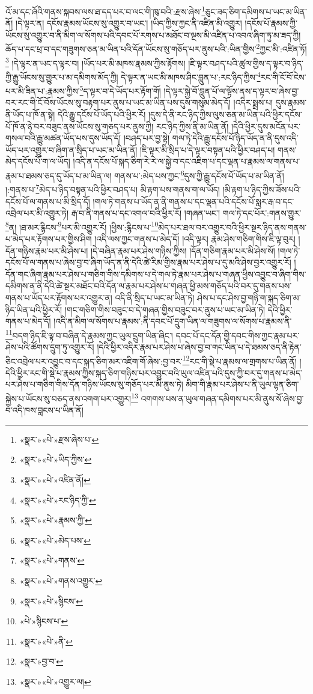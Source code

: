 འོ་མ་དང་ཞོའི་གནས་སྐབས་ལས་ཐ་དད་པར་བ་ལང་གི་ཁུ་བའི་:རྫས་ཞེས་\footnote{«སྣར་»«པེ་»རྫས་ཞེས་པ་}ཅུང་ཟད་ཅིག་དམིགས་པ་ཡང་མ་ཡིན་ནོ། །དེ་ལྟར་ན། དངོས་རྣམས་ཡོངས་སུ་འགྱུར་བ་ཡང་། །ཡིད་ཀྱིས་ཀྱང་ནི་འཛིན་མི་འགྱུར། །དངོས་པོ་རྣམས་ཀྱི་ཡོངས་སུ་འགྱུར་བ་ནི་མིག་ལ་སོགས་པའི་དབང་པོ་རགས་པ་མཐོང་བ་ལྔས་མི་འཛིན་པ་འབའ་ཞིག་ཏུ་མ་ཟད་ཀྱི། ཆོད་པ་དང་ཕྲ་བ་དང་གཟུགས་ཅན་མ་ཡིན་པའི་དོན་ཡོངས་སུ་གཅོད་པར་ནུས་པའི་:ཡིན་གྱིས་\footnote{«སྣར་»«པེ་»ཡིད་ཀྱིས་}ཀྱང་མི་:འཛིན་ཏོ།\footnote{«སྣར་»«པེ་»འཛིན་ནོ།} །དེ་ལྟར་ན་ཡང་ད་ལྟར་བ། །ཡོད་པར་མི་མཁས་རྣམས་ཀྱིས་རྟོགས། །ཇི་ལྟར་བཤད་པའི་ཚུལ་གྱིས་ད་ལྟར་བ་ཉིད་ཀྱི་རྒྱུ་ཡོངས་སུ་གྱུར་པ་མ་དམིགས་མོད་ཀྱི། དེ་ལྟར་ན་ཡང་མི་མཁས་ཤིང་བླུན་པ་:རང་ཉིད་ཀྱིས་\footnote{«སྣར་»«པེ་»རང་ཉིད་ཀྱི་}རང་གི་ངོ་བོ་ངེས་པར་མི་ཟིན་པ་:རྣམས་ཀྱིས་\footnote{«སྣར་»«པེ་»རྣམས་ཀྱི་}ད་ལྟར་བ་དེ་ཡོད་པར་རྟོག་གོ། །དེ་ལྟར་སྐྱེ་བོ་བླུན་པོ་ལ་ལྟོས་ནས་ད་ལྟར་བ་ཞེས་བྱ་བར་རང་གི་ངོ་བོས་ཡོངས་སུ་བརྟག་པར་ནུས་པ་ཡང་མ་ཡིན་པས་དུས་གསུམ་མེད་དོ། །འདིར་སྨྲས་པ། དུས་རྣམས་ནི་ཡོད་པ་ཁོ་ན་སྟེ། དེའི་རྒྱུ་དངོས་པོ་ཡོད་པའི་ཕྱིར་རོ། །དུས་དེ་ནི་རང་ཉིད་ཀྱིས་ལུས་ཅན་མ་ཡིན་པའི་ཕྱིར་དངོས་པོ་ཁོ་ན་ཉེ་བར་བཟུང་ནས་ཡོངས་སུ་གཅད་པར་ནུས་ཀྱི། རང་ཉིད་ཀྱིས་ནི་མ་ཡིན་ནོ། །དེའི་ཕྱིར་དུས་མངོན་པར་གསལ་བའི་རྒྱུ་མཚན་ཡོད་པས་དུས་ཡོད་དོ། །བཤད་པར་བྱ་སྟེ། གལ་ཏེ་དེའི་རྒྱུ་དངོས་པོ་ཉིད་ཡོད་ན་ནི་དུས་འདི་ཡོད་པར་འགྱུར་བ་ཞིག་ན་སྲིད་པ་ཡང་མ་ཡིན་ནོ། །ཇི་ལྟར་མི་སྲིད་པ་དེ་ལྟར་བསྟན་པའི་ཕྱིར་བཤད་པ། གནས་མེད་དངོས་པོ་ག་ལ་ཡོད། །འདི་ན་དངོས་པོ་སྐད་ཅིག་རེ་རེ་ལ་སྐྱེ་བ་དང་འཇིག་པ་དང་ལྡན་པ་རྣམས་ལ་གནས་པ་རྣམ་པ་ཐམས་ཅད་དུ་ཡོད་པ་མ་ཡིན་ལ། གནས་པ་:མེད་པས་ཀྱང་\footnote{«སྣར་»«པེ་»མེད་པས་}དུས་ཀྱི་རྒྱུ་དངོས་པོ་ཡོད་པ་མ་ཡིན་ནོ། །:གནས་པ་\footnote{«སྣར་»«པེ་»གནས་}མེད་པ་ཉིད་བསྟན་པའི་ཕྱིར་བཤད་པ། མི་རྟག་པས་གནས་ག་ལ་ཡོད། །མི་རྟག་པ་ཉིད་ཀྱིས་ཟོས་པའི་དངོས་པོ་ལ་གནས་པ་མི་སྲིད་དོ། །གལ་ཏེ་གནས་པ་ཡོད་ན་ནི་གནས་པ་དང་ལྡན་པའི་དངོས་པོ་སླར་རྒ་བ་དང་འབྲེལ་པར་མི་འགྱུར་ཏེ། རྒ་བ་ནི་གནས་པ་དང་འགལ་བའི་ཕྱིར་རོ། །གཞན་ཡང་། གལ་ཏེ་དང་པོར་:གནས་གྱུར་\footnote{«སྣར་»«པེ་»གནས་འགྱུར་}ན། །ཐ་མར་རྙིངས་\footnote{«སྣར་»«པེ་»སྙིངས་}པར་མི་འགྱུར་རོ། །ཕྱིས་:རྙིངས་པ་\footnote{«པེ་»སྙིངས་པ་}མེད་པར་ཐལ་བར་འགྱུར་བའི་ཕྱིར་སྔར་ཉིད་ནས་གནས་པ་མེད་པར་རྟོགས་པར་གྱིས་ཤིག །འདི་ལས་ཀྱང་གནས་པ་མེད་དོ། །འདི་ལྟར། རྣམ་ཤེས་གཅིག་གིས་ཇི་ལྟ་བུར། །དོན་གཉིས་རྣམ་པར་མི་ཤེས་པ། །དེ་བཞིན་རྣམ་པར་ཤེས་གཉིས་ཀྱིས། །དོན་གཅིག་རྣམ་པར་མི་ཤེས་སོ། །གལ་ཏེ་དངོས་པོ་ལ་གནས་པ་ཞེས་བྱ་བ་ཞིག་ཡོད་ན་ནི་དེའི་ཚེ་རིམ་གྱིས་རྣམ་པར་ཤེས་པ་དུ་མའི་ཤེས་བྱར་འགྱུར་རོ། །དོན་གང་ཞིག་རྣམ་པར་ཤེས་པ་གཅིག་གིས་དམིགས་པ་དེ་གལ་ཏེ་རྣམ་པར་ཤེས་པ་གཞན་ཕྱིས་འབྱུང་བ་ཞིག་གིས་དམིགས་ན་ནི་དེའི་ཚེ་སྔར་མཐོང་བའི་དོན་ལ་རྣམ་པར་ཤེས་པ་གཞན་ཕྱི་མས་གཅོད་པའི་བར་དུ་གནས་པས་གནས་པ་ཡོད་པར་རྟོགས་པར་འགྱུར་ན། འདི་ནི་སྲིད་པ་ཡང་མ་ཡིན་ཏེ། ཤེས་པ་དང་ཤེས་བྱ་གཉི་ག་སྐད་ཅིག་མ་ཉིད་ཡིན་པའི་ཕྱིར་རོ། །གང་གཅིག་གིས་བཟུང་བ་དེ་གཞན་གྱིས་བཟུང་བར་ནུས་པ་ཡང་མ་ཡིན་ཏེ། དེའི་ཕྱིར་གནས་པ་མེད་དོ། །འདི་ན་མིག་ལ་སོགས་པ་རྣམས་:ནི་དབང་པོ་དྲུག་ཡིན་ལ་གཟུགས་ལ་སོགས་པ་རྣམས་ནི་\footnote{«སྣར་»«པེ་»ནི་}བདག་ཉིད་ཇི་ལྟ་བ་བཞིན་དེ་རྣམས་ཀྱང་ཡུལ་དྲུག་ཡིན་ཞིང་། དབང་པོ་དང་དོན་གྱི་དབང་གིས་ཀྱང་རྣམ་པར་ཤེས་པའི་ཚོགས་དྲུག་ཏུ་འགྱུར་རོ། །དེའི་ཕྱིར་འདིར་རྣམ་པར་ཤེས་པ་ཞེས་བྱ་བ་གང་ཡིན་པ་དེ་ཐམས་ཅད་ནི་རྟེན་ཅིང་འབྲེལ་པར་འབྱུང་བ་དང་སྐད་ཅིག་མར་འཇིག་གོ་ཞེས་:བྱ་བར་\footnote{«སྣར་»བྱ་བ་}རང་གི་སྡེ་པ་རྣམས་ལ་གྲགས་པ་ཡིན་ནོ། །དེའི་ཕྱིར་རང་གི་སྡེ་པ་རྣམས་ཀྱིས་སྐད་ཅིག་གཉིས་པར་འབྱུང་བའི་ཡུལ་འཛིན་པའི་དུས་ཀྱི་བར་དུ་གནས་པ་མེད་པར་ཤེས་པ་གཅིག་གིས་དོན་གཉིས་ཡོངས་སུ་གཅོད་པར་མི་ནུས་ཏེ། མིག་གི་རྣམ་པར་ཤེས་པ་ནི་ཡུལ་ལྷན་ཅིག་སྐྱེས་པ་ཡོངས་སུ་བཅད་ནས་འགག་པར་འགྱུར།\footnote{«སྣར་»«པེ་»འགྱུར་ལ།} འགགས་པས་ན་ཡུལ་གཞན་དམིགས་པར་མི་ནུས་སོ་ཞེས་བྱ་བ་འདི་ཁས་བླངས་པ་ཡིན་ནོ། 